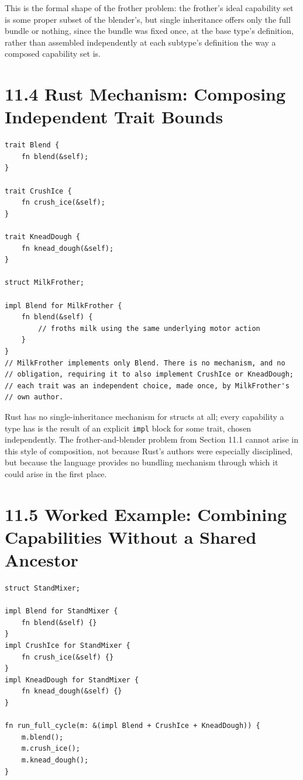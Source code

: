 \documentclass[11pt]{book}
\begin{document}
This is the formal shape of the frother problem: the frother's ideal capability set is some proper subset of the blender's, but single inheritance offers only the full bundle or nothing, since the bundle was fixed once, at the base type's definition, rather than assembled independently at each subtype's definition the way a composed capability set is.

\section*{11.4 Rust Mechanism: Composing Independent Trait Bounds}

\begin{lstlisting}
trait Blend {
    fn blend(&self);
}

trait CrushIce {
    fn crush_ice(&self);
}

trait KneadDough {
    fn knead_dough(&self);
}

struct MilkFrother;

impl Blend for MilkFrother {
    fn blend(&self) {
        // froths milk using the same underlying motor action
    }
}
// MilkFrother implements only Blend. There is no mechanism, and no
// obligation, requiring it to also implement CrushIce or KneadDough;
// each trait was an independent choice, made once, by MilkFrother's
// own author.
\end{lstlisting}

Rust has no single-inheritance mechanism for structs at all; every capability a type has is the result of an explicit \texttt{impl} block for some trait, chosen independently. The frother-and-blender problem from Section 11.1 cannot arise in this style of composition, not because Rust's authors were especially disciplined, but because the language provides no bundling mechanism through which it could arise in the first place.

\section*{11.5 Worked Example: Combining Capabilities Without a Shared Ancestor}

\begin{lstlisting}
struct StandMixer;

impl Blend for StandMixer {
    fn blend(&self) {}
}
impl CrushIce for StandMixer {
    fn crush_ice(&self) {}
}
impl KneadDough for StandMixer {
    fn knead_dough(&self) {}
}

fn run_full_cycle(m: &(impl Blend + CrushIce + KneadDough)) {
    m.blend();
    m.crush_ice();
    m.knead_dough();
}
\end{lstlisting}
\end{document}
